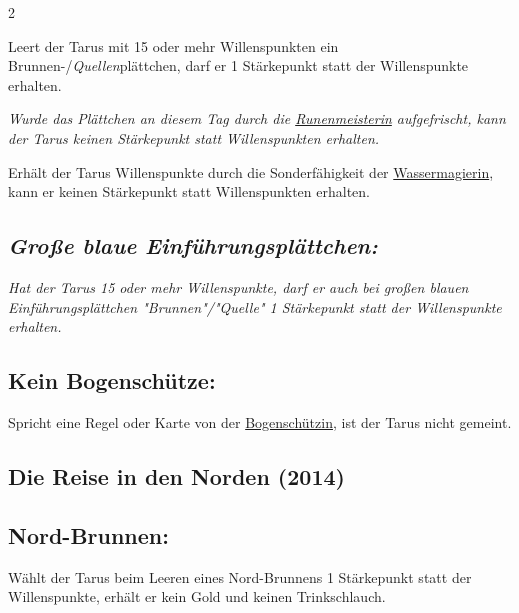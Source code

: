 \documentclass[10pt, a4paper, oneside]{book}
\newcommand{\fan}[1]{\textit{#1}}
\begin{document}
\begin{multicols*}{2}
\begin{nobgcolor}
Leert der Tarus mit 15 oder mehr Willenspunkten ein Brunnen-/\fan{Quellen}plättchen, darf er 1 Stärkepunkt statt der Willenspunkte erhalten.

\fan{Wurde das Plättchen an diesem Tag durch die \hyperref[Runenmeisterin]{Runenmeisterin} aufgefrischt, kann der Tarus keinen Stärkepunkt statt Willenspunkten erhalten.}
\supercite{137438}

Erhält der Tarus Willenspunkte durch die Sonderfähigkeit der \hyperref[Wassermagierin]{Wassermagierin}, kann er keinen Stärkepunkt statt Willenspunkten erhalten.




\subsection{\fan{Große blaue Einführungsplättchen:}}

\fan{Hat der Tarus 15 oder mehr Willenspunkte, darf er auch bei großen blauen Einführungsplättchen "Brunnen"/"Quelle" 1 Stärkepunkt statt der Willenspunkte erhalten.}




\subsection{Kein Bogenschütze:}

Spricht eine Regel oder Karte von der \hyperref[Bogenschützin]{Bogenschützin}, ist der Tarus nicht gemeint.




\end{nobgcolor}







\begin{bgcolor}
\section{Die Reise in den Norden (2014)}


\subsection{Nord-Brunnen:}

Wählt der Tarus beim Leeren eines Nord-Brunnens 1 Stärkepunkt statt der Willenspunkte, erhält er kein Gold und keinen Trinkschlauch.
\supercite{DRidN:Begleitheft}

\end{bgcolor}




\end{multicols*}
\end{document}
